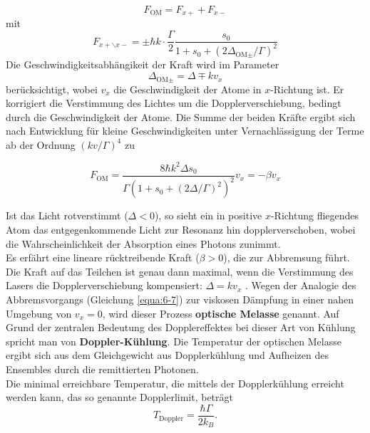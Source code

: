 \documentclass[
class=book,
accentcolor=1b,
custommargins=geometry,
fontsize=11pt,
thesis={type=Versuchsanleitung},
ruledheaders=all,
headline=false,
instbox=false,
marginpar=false,
title=small,
ignore-missing-data=true,
twoside=false,
logofile=apqdesign/tuda_logo.pdf,
pdfa=false %
]{apqpub}
\begin{document}
				\begin{equation}
				F_{\text{OM}} = F_{x+} + F_{x-}
				\end{equation}			
				mit
				\begin{equation}\label{equa:6-5}
				F_{x+\backslash x-} = \pm \hbar k \cdot \frac{\varGamma}{2} \frac{s_0}{1+s_0+(2\varDelta_{{\text{OM}}\pm}/\varGamma)^2} 
				\end{equation}
				Die Geschwindigkeitsabhängikeit der Kraft wird im Parameter			
				\begin{equation}
				\varDelta_{\text{OM}\pm} = \varDelta \mp k v_{x}
				\end{equation}
				berücksichtigt, wobei $v_x$ die Geschwindigkeit der Atome in $x$-Richtung ist. 
				Er korrigiert die Verstimmung des Lichtes um die Dopplerverschiebung, bedingt durch die Geschwindigkeit der Atome. 
				Die Summe der beiden Kräfte ergibt sich nach Entwicklung für kleine Geschwindigkeiten unter Vernachlässigung der Terme ab der Ordnung $(kv/\varGamma)^4$ zu
				
				\begin{equation}\label{equa:6-7}
				F_{\text{OM}} = \frac{8 \hbar k^2 \varDelta s_0}{\varGamma (1+s_0 + (2\varDelta/\varGamma)^2)^2} v_x = -\beta v_x
				\end{equation}
				
				Ist das Licht rotverstimmt ($\varDelta < 0$), so sieht ein in positive $x$-Richtung fliegendes Atom das entgegenkommende Licht zur Resonanz hin dopplerverschoben, wobei die Wahrscheinlichkeit der Absorption eines Photons zunimmt.\\
				Es erfährt eine lineare rücktreibende Kraft ($\beta > 0$), die zur Abbremsung führt. 
				Die Kraft auf das Teilchen ist genau dann maximal, wenn die Verstimmung des Lasers die Dopplerverschiebung kompensiert: $\varDelta = k v_x$ .
				Wegen der Analogie des Abbremsvorgangs (Gleichung \eqref{equa:6-7}) zur viskosen Dämpfung in einer nahen Umgebung von $v_x = 0$, wird dieser Prozess \textbf{optische Melasse} genannt. 
				Auf Grund der zentralen Bedeutung des Dopplereffektes bei dieser Art von Kühlung spricht man von \textbf{Doppler-Kühlung}. 
				Die Temperatur der optischen Melasse ergibt sich aus dem Gleichgewicht aus Dopplerkühlung und Aufheizen des Ensembles durch die remittierten Photonen.\\ 
				Die minimal erreichbare Temperatur, die mittels der Dopplerkühlung erreicht werden kann, das so genannte Dopplerlimit, beträgt				
				\begin{equation}
				T_{\text{Doppler}} = \frac{\hbar \varGamma}{2 k_B}.
				\end{equation}
				
\end{document}
